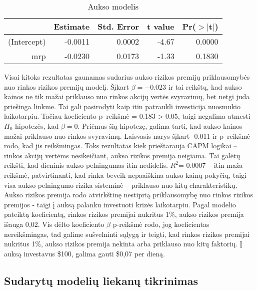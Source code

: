 \documentclass[12pt, a14paper, lithuanian]{article}
\begin{document}
\begin{table}[ht]
\begin{center}
\begin{tabular}{rrrrr}
  \hline
 & Estimate & Std. Error & t value & Pr($>$$|$t$|$) \\ 
  \hline
(Intercept) & -0.0011 & 0.0002 & -4.67 & 0.0000 \\ 
  mrp & -0.0230 & 0.0173 & -1.33 & 0.1830 \\ 
   \hline
\end{tabular}
\end{center}
\caption{Aukso modelis}
\end{table}

Visai kitoks rezultatas gaunamas sudarius aukso rizikos premijų priklausomybės nuo rinkos rizikos premijų modelį.
Šįkart $\beta=-0.023$ ir tai reikštų, kad aukso kainos ne tik mažai priklauso nuo rinkos akcijų vertės svyravimų,
bet netgi juda priešinga linkme. Tai gali pasirodyti kaip itin patraukli investicija nuosmukio laikotarpiu.
Tačiau koeficiento p--reikšmė = 0.183 > 0.05, taigi negalima atmesti $ H_0 $ hipotezės, kad $\beta=0 $.
Priėmus šią hipotezę, galima tarti, kad aukso kainos mažai priklauso nuo rinkos svyravimų.
Laisvasis narys šįkart -0.011 ir p--reikšmė rodo, kad jis reikšmingas. Toks rezultatas kiek prieštarauja CAPM logikai -- rinkos akcijų vertėms nesikeičiant, aukso rizikos premija neigiama. Tai galėtų reikšti,
kad dieninis aukso pelningumas itin nedidelis.
$ R^2 $= 0.0007 -- itin maža reikšmė, patvirtinanti, kad rinka beveik nepaaiškina aukso kainų pokyčių, taigi 
visa aukso pelningumo rizika sisteminė -- priklauso nuo kitų charakteristikų. \\


Aukso rizikos premija rodo atvirkštinę nestiprią priklausomybę nuo rinkos rizikos premijos - taigi į auksą palanku investuoti krizės laikotarpiu. Pagal modelio pateiktą koeficientą, rinkos rizikos premijai nukritus 1\%, aukso rizikos premija išauga 0,02. Vis dėlto koeficiento $\beta$ p-reikšmė rodo, jog koeficientas nereikšmingas, tad galime sušvelninti sąlygą ir teigti, kad rinkos rizikos premijai nukritus 1\%, aukso rizikos premija nekinta arba priklauso nuo kitų faktorių. Į auksą investavus \$100, galima gauti \$0,07 per dieną.



\subsection{Sudarytų modelių liekanų tikrinimas}
\end{document}
